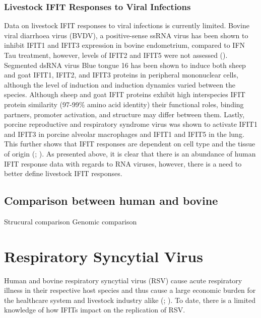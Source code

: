 \subsubsection{Livestock IFIT Responses to Viral Infections} \label{Livestock IFIT Responses to Viral Infections}
Data on livestock IFIT responses to viral infections is currently limited. Bovine viral diarrhoea virus (BVDV), a positive-sense ssRNA virus has been shown to inhibit IFIT1 and IFIT3 expression in bovine endometrium, compared to IFN Tau treatment, however, levels of IFIT2 and IFIT5 were not assessed (\cite{Cheng2017AcuteEndometrium}). Segmented dsRNA virus Blue tongue 16 has been shown to induce both sheep and goat IFIT1, IFIT2, and IFIT3 proteins in peripheral mononuclear cells, although the level of induction and induction dynamics varied between the species. Although sheep and goat IFIT proteins exhibit high interspecies IFIT protein similarity (97-99\% amino acid identity) their functional roles, binding partners, promoter activation, and structure may differ between them.  Lastly, porcine reproductive and respiratory syndrome virus was shown to activate IFIT1 and IFIT3 in porcine alveolar macrophages and IFIT1 and IFIT5 in the lung. This further shows that IFIT responses are dependent on cell type and the tissue of origin (\cite{Xiao2010AberrantProfiling}; \cite{Zhou2011MolecularVivo/i}). As presented above, it is clear that there is an abundance of human IFIT response data with regards to RNA viruses, however, there is a need to better define livestock IFIT responses.




\subsection{Comparison between human and bovine} \label{subsec:Comparison between human and bovine}
Strucural comparison \newline 
Genomic comparison




\section{Respiratory Syncytial Virus} \label{sec:Respiratory Syncytial Virus}
Human and bovine respiratory syncytial virus (RSV) cause acute respiratory illness in their respective host species and thus cause a large economic burden for the healthcare system and livestock industry alike (\cite{Jha2016RespiratoryVirus}; \cite{Sacco2014RespiratoryCattle}). To date, there is a limited knowledge of how IFITs impact on the replication of RSV. 

